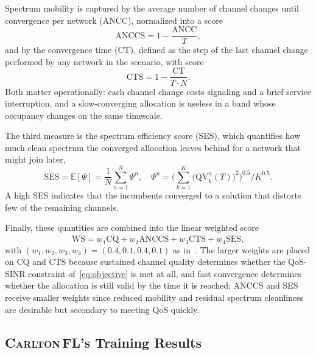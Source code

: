 \documentclass[journal]{IEEEtran}
\newcommand{\OURS}{\textsc{Carlton\,FL}}
\begin{document}
Spectrum mobility is captured by the average number of channel changes until
convergence per network (ANCC), normalized into a score
\begin{equation}
\mathrm{ANCCS}=1-\frac{\mathrm{ANCC}}{T},
\label{eq:anccs}
\end{equation}
and by the convergence time (CT), defined as the step of the last channel
change performed by any network in the scenario, with score
\begin{equation}
\mathrm{CTS}=1-\frac{\mathrm{CT}}{T\cdot N}.
\label{eq:cts}
\end{equation}
Both matter operationally: each channel change costs signaling and a brief
service interruption, and a slow-converging allocation is useless in a band
whose occupancy changes on the same timescale.

The third measure is the spectrum efficiency score (SES), which quantifies how
much clean spectrum the converged allocation leaves behind for a network that
might join later,
\begin{equation}
\mathrm{SES}=\mathbb{E}[\Psi]=\frac{1}{N}\sum_{n=1}^{N}\Psi^{n},\quad
\Psi^{n}=\Big(\sum_{k=1}^{K}\big(\mathrm{QV}^{n}_{k}(T)\big)^{2}\Big)^{0.5}
\big/K^{0.5}.
\label{eq:ses}
\end{equation}
A high SES indicates that the incumbents converged to a solution that distorts
few of the remaining channels.

Finally, these quantities are combined into the linear weighted score
\begin{equation}
\mathrm{WS}=w_{1}\overline{\mathrm{CQ}}+w_{2}\mathrm{ANCCS}
+w_{3}\mathrm{CTS}+w_{4}\mathrm{SES},
\label{eq:ws}
\end{equation}
with $(w_{1},w_{2},w_{3},w_{4})=(0.4,0.1,0.4,0.1)$ as
in~\cite{cohen2024carlton}. The larger weights are placed on
$\overline{\mathrm{CQ}}$ and CTS because sustained channel quality determines
whether the QoS-SINR constraint of~\eqref{eq:objective} is met at all, and fast
convergence determines whether the allocation is still valid by the time it is
reached; ANCCS and SES receive smaller weights since reduced mobility and
residual spectrum cleanliness are desirable but secondary to meeting QoS
quickly.

\subsection{\texorpdfstring{\OURS{}'s Training Results}{CARLTON FL's Training Results}}
\label{subsec:exp_reward}
\end{document}
